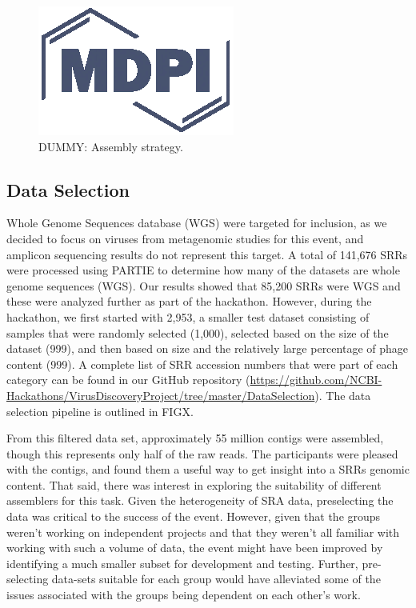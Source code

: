   \begin{figure}
    \centering
    \includegraphics{Definitions/logo-mdpi}
    \caption{DUMMY: Assembly strategy.
            \label{fig:asm_strategy}}
  \end{figure}

  \subsection{Data Selection}
  Whole Genome Sequences database (WGS) were  targeted for inclusion, as we
  decided to focus on viruses from metagenomic studies for this event, and
  amplicon sequencing results do not represent this target. A total of 141,676
  SRRs were processed using PARTIE \cite{Torres2017} to determine how many of the datasets
  are whole genome sequences (WGS). Our results showed that 85,200 SRRs were
  WGS and these were analyzed further as part of the hackathon. However, during
  the hackathon, we first started with 2,953, a smaller test dataset consisting
  of samples that were randomly selected (1,000), selected based on the size of
  the dataset (999), and then based on size and the relatively large percentage
  of phage content (999). A complete list of SRR accession numbers that were
  part of each category can be found in our GitHub repository
  (\url{https://github.com/NCBI-Hackathons/VirusDiscoveryProject/tree/master/DataSelection}).
  The data selection pipeline is outlined in FIGX.

  From this filtered data set, approximately 55 million contigs were assembled,
  though this represents only half of the raw reads. The participants were
  pleased with the contigs, and found them a useful way to get insight into a
  SRRs genomic content. That said, there was interest in exploring the
  suitability of different assemblers for this task. Given the heterogeneity of
  SRA data, preselecting the data was critical to the success of the event.
  However, given that the groups weren't working on independent projects and
  that they weren't all familiar with working with such a volume of data, the
  event might have been improved by identifying a much smaller subset for
  development and testing. Further, pre-selecting data-sets suitable for each
  group would have alleviated some of the issues associated with the groups
  being dependent on each other's work.


